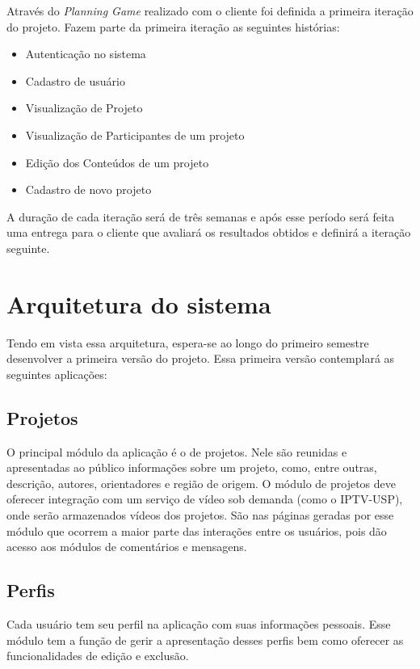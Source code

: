     Através do \textit{Planning Game} realizado com o cliente foi definida a primeira iteração do projeto. Fazem parte da primeira iteração as seguintes histórias:

    \begin{itemize}
      \item Autenticação no sistema
      \item Cadastro de usuário
      \item Visualização de Projeto
      \item Visualização de Participantes de um projeto
      \item Edição dos Conteúdos de um projeto
      \item Cadastro de novo projeto
    \end{itemize}

    A duração de cada iteração será de três semanas e após esse período será feita uma entrega para o cliente que avaliará os resultados obtidos e definirá a iteração seguinte.

\section{Arquitetura do sistema}

  Tendo em vista essa arquitetura, espera-se ao longo do primeiro semestre desenvolver a primeira versão do projeto. Essa primeira versão contemplará as seguintes aplicações:

  \subsection{Projetos}
    O principal módulo da aplicação é o de projetos. Nele são reunidas e apresentadas ao público informações sobre um projeto, como, entre outras, descrição, autores, orientadores e região de origem. O módulo de projetos deve oferecer integração com um serviço de vídeo sob demanda (como o IPTV-USP), onde serão armazenados vídeos dos projetos. São nas páginas geradas por esse módulo que ocorrem a maior parte das interações entre os usuários, pois dão acesso aos módulos de comentários e mensagens.

  \subsection{Perfis}
    Cada usuário tem seu perfil na aplicação com suas informações pessoais. Esse módulo tem a função de gerir a apresentação desses perfis bem como oferecer as funcionalidades de edição e exclusão.

